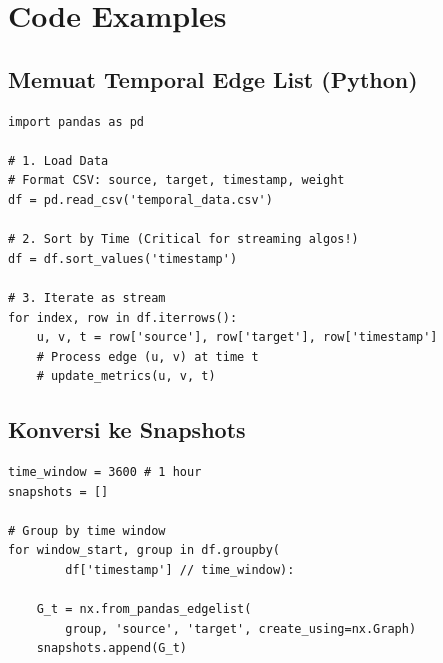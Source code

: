 \documentclass[12pt,a4paper]{book}
\begin{document}
\chapter{Code Examples}
\section*{Memuat Temporal Edge List (Python)}
\begin{verbatim}
import pandas as pd

# 1. Load Data
# Format CSV: source, target, timestamp, weight
df = pd.read_csv('temporal_data.csv')

# 2. Sort by Time (Critical for streaming algos!)
df = df.sort_values('timestamp')

# 3. Iterate as stream
for index, row in df.iterrows():
    u, v, t = row['source'], row['target'], row['timestamp']
    # Process edge (u, v) at time t
    # update_metrics(u, v, t)
\end{verbatim}

\section*{Konversi ke Snapshots}
\begin{verbatim}
time_window = 3600 # 1 hour
snapshots = []

# Group by time window
for window_start, group in df.groupby(
        df['timestamp'] // time_window):
    
    G_t = nx.from_pandas_edgelist(
        group, 'source', 'target', create_using=nx.Graph)
    snapshots.append(G_t)
\end{verbatim}

\backmatter

%
%

\end{document}
